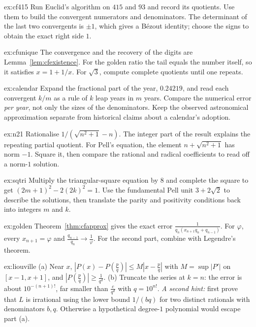 \begin{hint}{ex:cf415}
Run Euclid's algorithm on $415$ and $93$ and record its quotients. Use them to build the convergent numerators and denominators. The determinant of the last two convergents is $\pm1$, which gives a B\'ezout identity; choose the signs to obtain the exact right side $1$.
\end{hint}
\begin{hint}{ex:cfunique}
The convergence and the recovery of the digits are Lemma~\ref{lem:cfexistence}. For the golden ratio the tail equals the number itself, so it satisfies $x=1+1/x$. For $\sqrt3$, compute complete quotients until one repeats.
\end{hint}
\begin{hint}{ex:calendar}
Expand the fractional part of the year, $0.24219$, and read each convergent $k/m$ as a rule of $k$ leap years in $m$ years. Compare the numerical error \emph{per year}, not only the sizes of the denominators. Keep the observed astronomical approximation separate from historical claims about a calendar's adoption.
\end{hint}
\begin{hint}{ex:n21}
Rationalise $1/(\sqrt{n^2+1}-n)$. The integer part of the result explains the repeating partial quotient. For Pell's equation, the element $n+\sqrt{n^2+1}$ has norm $-1$. Square it, then compare the rational and radical coefficients to read off a norm-$1$ solution.
\end{hint}
\begin{hint}{ex:sqtri}
Multiply the triangular-square equation by $8$ and complete the square to get $(2m+1)^2-2(2k)^2=1$. Use the fundamental Pell unit $3+2\sqrt2$ to describe the solutions, then translate the parity and positivity conditions back into integers $m$ and $k$.
\end{hint}
\begin{hint}{ex:golden}
Theorem~\ref{thm:cfapprox} gives the exact error $\frac1{q_n(x_{n+1}q_n+q_{n-1})}$. For $\varphi$, every $x_{n+1}=\varphi$ and $\frac{q_{n-1}}{q_n}\to\frac1\varphi$. For the second part, combine with Legendre's theorem.
\end{hint}
\begin{hint}{ex:liouville}
(a) Near $x$, $|P(x)-P(\frac pq)|\le M|x-\frac pq|$ with $M=\sup|P'|$ on $[x-1,x+1]$, and $|P(\frac pq)|\ge\frac1{q^d}$. (b) Truncate the series at $k=n$: the error is about $10^{-(n+1)!}$, far smaller than $\frac c{q^d}$ with $q=10^{n!}$. \emph{A second hint:} first prove that $L$ is irrational using the lower bound $1/(bq)$ for two distinct rationals with denominators $b,q$. Otherwise a hypothetical degree-$1$ polynomial would escape part (a).
\end{hint}

